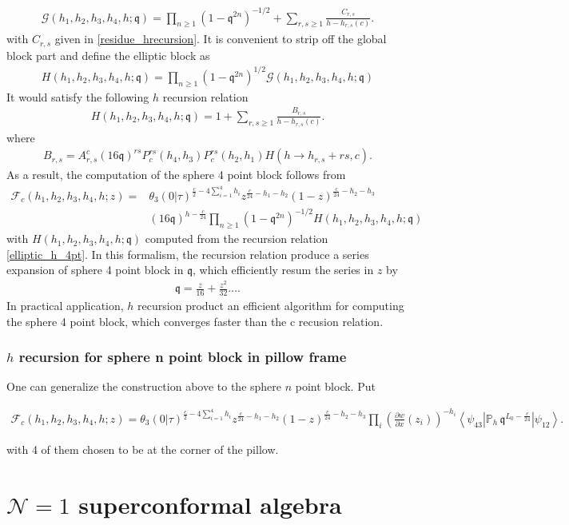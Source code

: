 \documentclass[12pt]{article}
\newcommand{\ie}{\begin{equation}\begin{aligned}}
\newcommand{\fe}{\end{aligned}\end{equation}}
\numberwithin{equation}{section}
\begin{document}
\ie
\mathcal{G}(h_1,h_2,h_3,h_4,h; \mathfrak{q}) = \prod_{n\geq 1}(1-\mathfrak{q}^{2n})^{-1/2}+ \sum_{r,s\geq 1}\frac{C_{r,s}}{h-h_{r,s}(c)}.
\fe
with $C_{r,s}$ given in \eqref{residue_hrecursion}. It is convenient to strip off the global block part and define the elliptic block as
\ie
H(h_1,h_2,h_3,h_4,h; \mathfrak{q})= \prod_{n\geq 1}(1-\mathfrak{q}^{2n})^{1/2}\mathcal{G}(h_1,h_2,h_3,h_4,h; \mathfrak{q})
\fe
It would satisfy the following $h$ recursion relation
\ie\label{elliptic_h_4pt}
H(h_1,h_2,h_3,h_4,h; \mathfrak{q}) =1+ \sum_{r,s\geq 1}\frac{B_{r,s}}{h-h_{r,s}(c)}.
\fe
where
\ie
B_{r,s}=A_{r,s}^c (16\mathfrak{q})^{rs} P_c^{rs}(h_{4}, h_{3}) P_c^{rs}(h_{2}, h_{1}) H(h\rightarrow h_{r,s}+rs, c).
\fe
As a result, the computation of the sphere 4 point block follows from
\ie
\mathcal F_c(h_1,h_2,h_3,h_4,h;z)
={}&
\theta_3(0|\tau)^{\frac c2-4\sum_{i=1}^4 h_i}
z^{\frac c{24}-h_1-h_2}
(1-z)^{\frac c{24}-h_2-h_3} \\
&(16\mathfrak{q})^{h-\frac{c}{24}}  \prod_{n\geq 1}(1-\mathfrak{q}^{2n})^{-1/2} H(h_1,h_2,h_3,h_4,h; \mathfrak{q})
\fe
with $H(h_1,h_2,h_3,h_4,h; \mathfrak{q})$ computed from the recursion relation \eqref{elliptic_h_4pt}. In this formalism, the recursion relation produce a series expansion of sphere 4 point block in $\mathfrak{q}$, which efficiently resum the series in $z$ by
\ie
\mathfrak{q} = \frac{z}{16}+ \frac{z^2}{32} \dots.
\fe
In practical application, $h$ recursion product an efficient algorithm for computing the sphere 4 point block, which converges faster than the c recusion relation.


\subsubsection*{$h$ recursion for sphere n point block in pillow frame}

One can generalize the construction above to the sphere $n$ point block. Put 

\ie
\mathcal F_c(h_1,h_2,h_3,h_4,h;z)
={}
\theta_3(0|\tau)^{\frac c2-4\sum_{i=1}^4 h_i}
z^{\frac c{24}-h_1-h_2}
(1-z)^{\frac c{24}-h_2-h_3} \prod_i \left(\frac{\partial w}{\partial x}(z_i)\right)^{-h_i}
\left\langle\psi_{43}\left|
\mathbb P_h\,\mathfrak{q}^{L_0-\frac c{24}}
\right|\psi_{12}\right\rangle.
\fe




with 4 of them chosen to be at the corner of the pillow. 






\section{$\mathcal{N}=1$ superconformal algebra}
\end{document}
